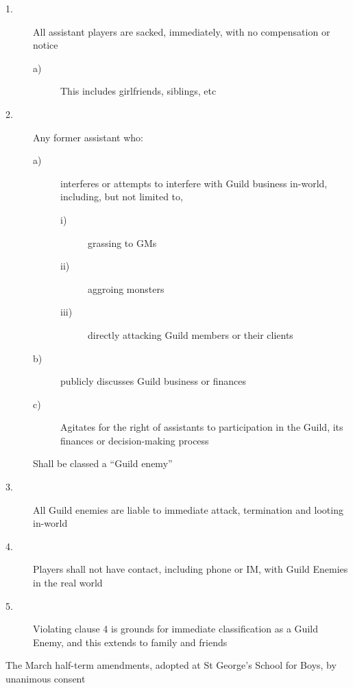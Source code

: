 \begin{description}
\item[1.] All assistant players are sacked, immediately, with no compensation 
or notice

\begin{description}
\item[a)] This includes girlfriends, siblings, etc 

\end{description}

\item[2.] Any former assistant who:

\begin{description}
\item[a)] interferes or attempts to interfere with 
Guild business in-world, including, but not limited to, 


\begin{description}
\item[i)] grassing to GMs 

\item[ii)] aggroing monsters 


\item[iii)] directly attacking Guild members or 
their clients 
\end{description}

\item[b)] publicly discusses Guild business or 
finances 

\item[c)] Agitates for the right of assistants to 
participation in the Guild, its finances or decision-making process 

\end{description}

Shall be classed a “Guild enemy”

\item[3.] All Guild enemies are liable to immediate attack, termination and 
looting in-world

\item[4.] Players shall not have contact, including phone or IM, with Guild 
Enemies in the real world

\item[5.] Violating clause 4 is grounds for immediate classification as a 
Guild Enemy, and this extends to family and friends
\end{description}

\tb

The March half-term amendments, adopted at St George's School for Boys, 
by unanimous consent

